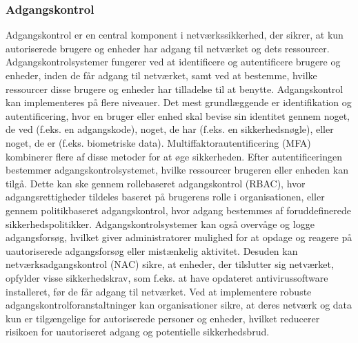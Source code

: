 \subsubsection{Adgangskontrol}
Adgangskontrol er en central komponent i netværkssikkerhed, der sikrer, at kun autoriserede brugere og enheder har adgang til netværket og dets ressourcer. Adgangskontrolsystemer fungerer ved at identificere og autentificere brugere og enheder, inden de får adgang til netværket, samt ved at bestemme, hvilke ressourcer disse brugere og enheder har tilladelse til at benytte.
\newline\newline\noindent
Adgangskontrol kan implementeres på flere niveauer. Det mest grundlæggende er identifikation og autentificering, hvor en bruger eller enhed skal bevise sin identitet gennem noget, de ved (f.eks. en adgangskode), noget, de har (f.eks. en sikkerhedsnøgle), eller noget, de er (f.eks. biometriske data). Multiffaktorautentificering (MFA) kombinerer flere af disse metoder for at øge sikkerheden.
\newline\newline\noindent
Efter autentificeringen bestemmer adgangskontrolsystemet, hvilke ressourcer brugeren eller enheden kan tilgå. Dette kan ske gennem rollebaseret adgangskontrol (RBAC), hvor adgangsrettigheder tildeles baseret på brugerens rolle i organisationen, eller gennem politikbaseret adgangskontrol, hvor adgang bestemmes af foruddefinerede sikkerhedspolitikker.
\newline\newline\noindent
Adgangskontrolsystemer kan også overvåge og logge adgangsforsøg, hvilket giver administratorer mulighed for at opdage og reagere på uautoriserede adgangsforsøg eller mistænkelig aktivitet. Desuden kan netværksadgangskontrol (NAC) sikre, at enheder, der tilslutter sig netværket, opfylder visse sikkerhedskrav, som f.eks. at have opdateret antivirussoftware installeret, før de får adgang til netværket.
\newline\newline\noindent
Ved at implementere robuste adgangskontrolforanstaltninger kan organisationer sikre, at deres netværk og data kun er tilgængelige for autoriserede personer og enheder, hvilket reducerer risikoen for uautoriseret adgang og potentielle sikkerhedsbrud.


